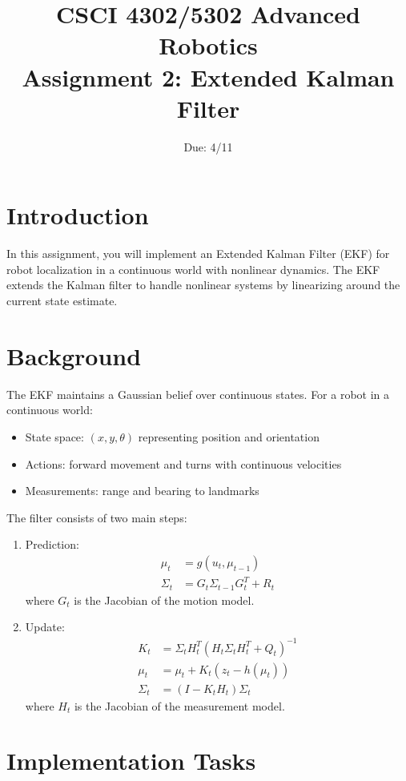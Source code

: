 \documentclass[11pt]{article}
\title{CSCI 4302/5302 Advanced Robotics\\
Assignment 2: Extended Kalman Filter}
\author{Due: 4/11}
\date{}
\begin{document}
\maketitle

\section{Introduction}
In this assignment, you will implement an Extended Kalman Filter (EKF) for robot localization in a continuous world with nonlinear dynamics. The EKF extends the Kalman filter to handle nonlinear systems by linearizing around the current state estimate.

\section{Background}
The EKF maintains a Gaussian belief over continuous states. For a robot in a continuous world:
\begin{itemize}
    \item State space: \((x, y, \theta)\) representing position and orientation
    \item Actions: forward movement and turns with continuous velocities
    \item Measurements: range and bearing to landmarks
\end{itemize}

The filter consists of two main steps:
\begin{enumerate}
    \item Prediction:
    \begin{align*}
        \mu_t &= g(u_t, \mu_{t-1})\\
        \Sigma_t &= G_t\Sigma_{t-1}G_t^T + R_t
    \end{align*}
    where \(G_t\) is the Jacobian of the motion model.
    
    \item Update:
    \begin{align*}
        K_t &= \Sigma_t H_t^T(H_t\Sigma_t H_t^T + Q_t)^{-1}\\
        \mu_t &= \mu_t + K_t(z_t - h(\mu_t))\\
        \Sigma_t &= (I - K_tH_t)\Sigma_t
    \end{align*}
    where \(H_t\) is the Jacobian of the measurement model.
\end{enumerate}

\section{Implementation Tasks}
\end{document}
